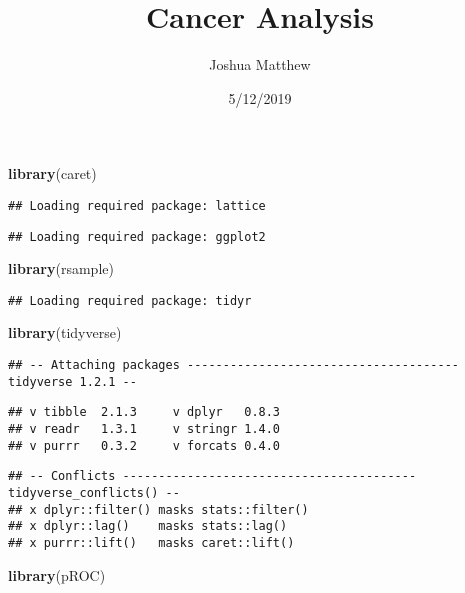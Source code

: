 \documentclass[]{article}
\title{Cancer Analysis}
\author{Joshua Matthew}
\date{5/12/2019}
\newenvironment{Shaded}{\begin{snugshade}}{\end{snugshade}}
\newcommand{\KeywordTok}[1]{\textcolor[rgb]{0.13,0.29,0.53}{\textbf{#1}}}
\newcommand{\NormalTok}[1]{#1}
\begin{document}
\maketitle

\begin{Shaded}
\begin{Highlighting}[]
\KeywordTok{library}\NormalTok{(caret)}
\end{Highlighting}
\end{Shaded}

\begin{verbatim}
## Loading required package: lattice
\end{verbatim}

\begin{verbatim}
## Loading required package: ggplot2
\end{verbatim}

\begin{Shaded}
\begin{Highlighting}[]
\KeywordTok{library}\NormalTok{(rsample)}
\end{Highlighting}
\end{Shaded}

\begin{verbatim}
## Loading required package: tidyr
\end{verbatim}

\begin{Shaded}
\begin{Highlighting}[]
\KeywordTok{library}\NormalTok{(tidyverse)}
\end{Highlighting}
\end{Shaded}

\begin{verbatim}
## -- Attaching packages -------------------------------------- tidyverse 1.2.1 --
\end{verbatim}

\begin{verbatim}
## v tibble  2.1.3     v dplyr   0.8.3
## v readr   1.3.1     v stringr 1.4.0
## v purrr   0.3.2     v forcats 0.4.0
\end{verbatim}

\begin{verbatim}
## -- Conflicts ----------------------------------------- tidyverse_conflicts() --
## x dplyr::filter() masks stats::filter()
## x dplyr::lag()    masks stats::lag()
## x purrr::lift()   masks caret::lift()
\end{verbatim}

\begin{Shaded}
\begin{Highlighting}[]
\KeywordTok{library}\NormalTok{(pROC)}
\end{Highlighting}
\end{Shaded}
\end{document}
